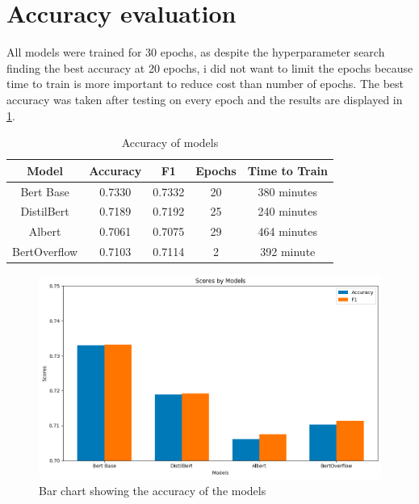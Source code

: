 \documentclass{UoYCSproject}
\begin{document}
    \section{Accuracy evaluation}\label{sec:accuracy-evaluation}
    All models were trained for 30 epochs, as despite the hyperparameter search finding the best accuracy at 20 epochs, i did not want to limit the epochs because time to train is more important to reduce cost than number of epochs. The best accuracy was taken after testing on every epoch and the results are displayed in \ref{tab:accuracy}. \par



\begin{table}[h]
\centering
\begin{tabular}{ccccc}
\toprule
Model        & Accuracy & F1     & Epochs  & Time to Train\\
\midrule
Bert Base    & 0.7330   & 0.7332 & 20 & 380 minutes     \\\addlinespace[0.5em]
DistilBert   & 0.7189   & 0.7192 & 25 & 240 minutes     \\\addlinespace[0.5em]
Albert       & 0.7061   & 0.7075 & 29 & 464 minutes    \\\addlinespace[0.5em]
BertOverflow & 0.7103   & 0.7114 & 2 & 392 minute      \\
\bottomrule
\end{tabular}

\caption{Accuracy of models} \label{tab:accuracy}
\end{table}

\begin{figure}[h]
    \centering

        \includegraphics[width=12cm]{./figures/model-accuracy}
        \caption{Bar chart showing the accuracy of the models}
        \label{fig:accuracy}
    \end{figure}
\end{document}
